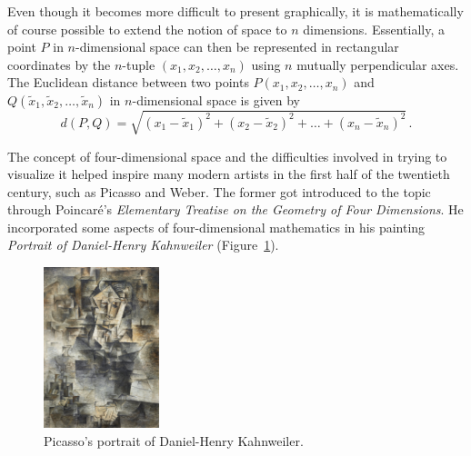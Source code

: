 


\ifanalysis

Even though it becomes more difficult to present graphically, it is mathematically of course possible to extend the notion of space to $n$ dimensions. Essentially, a point $P$ in $n$-dimensional space can then be represented in rectangular coordinates by the $n$-tuple $(x_1,x_2,\ldots,x_n)$ using $n$ mutually perpendicular axes. The Euclidean distance between two points $P\left(x_{1}, x_{2},\ldots, x_{n}\right)$ and $Q\left(\widetilde{x}_{1}, \widetilde{x}_{2},\ldots, \widetilde{x}_{n}\right)$ in $n$-dimensional space is given by 
\begin{equation}
d(P,Q)=\sqrt{\left(x_1-\widetilde{x}_1\right)^2+\left(x_2-\widetilde{x}_2\right)^2+\ldots+\left(x_n-\widetilde{x}_n\right)^2}\,.\label{def:space_distancend}
\end{equation}

\fi

\begin{remark}
The concept of four-dimensional space and the difficulties involved in trying to visualize it helped inspire many modern artists in the first half of the twentieth century, such as Picasso and Weber. The former got introduced to the topic through Poincar\'e's \textit{Elementary Treatise on the Geometry of Four Dimensions}. He incorporated some aspects of four-dimensional mathematics in his painting \textit{Portrait of Daniel-Henry Kahnweiler} (Figure~\ref{fig_vector_14}). 

	\begin{figure}[H]
	\begin{center}
			\includegraphics[width=0.3\textwidth]{fig_vector_14}
	\caption{Picasso's portrait of Daniel-Henry Kahnweiler.}
	\label{fig_vector_14}
	\end{center}
\end{figure}

\end{remark}
